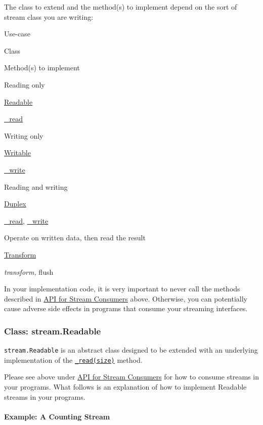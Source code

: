 The class to extend and the method(s) to implement depend on the sort of
stream class you are writing:

Use-case

Class

Method(s) to implement

Reading only

\hyperref[streamux5fclassux5fstreamux5freadableux5f1]{Readable}

\hyperref[streamux5freadableux5freadux5fsizeux5f1]{\_read}

Writing only

\hyperref[streamux5fclassux5fstreamux5fwritableux5f1]{Writable}

\hyperref[streamux5fwritableux5fwriteux5fchunkux5fencodingux5fcallbackux5f1]{\_write}

Reading and writing

\hyperref[streamux5fclassux5fstreamux5fduplexux5f1]{Duplex}

\hyperref[streamux5freadableux5freadux5fsizeux5f1]{\_read},
\hyperref[streamux5fwritableux5fwriteux5fchunkux5fencodingux5fcallbackux5f1]{\_write}

Operate on written data, then read the result

\hyperref[streamux5fclassux5fstreamux5ftransformux5f1]{Transform}

\emph{transform, }flush

In your implementation code, it is very important to never call the
methods described in
\hyperref[streamux5fapiux5fforux5fstreamux5fconsumers]{API for Stream
Consumers} above. Otherwise, you can potentially cause adverse side
effects in programs that consume your streaming interfaces.

\subsubsection{Class: stream.Readable}\label{class-stream.readable-1}

\texttt{stream.Readable} is an abstract class designed to be extended
with an underlying implementation of the
\hyperref[streamux5freadableux5freadux5fsizeux5f1]{\texttt{\_read(size)}}
method.

Please see above under
\hyperref[streamux5fapiux5fforux5fstreamux5fconsumers]{API for Stream
Consumers} for how to consume streams in your programs. What follows is
an explanation of how to implement Readable streams in your programs.

\paragraph{Example: A Counting Stream}\label{example-a-counting-stream}


